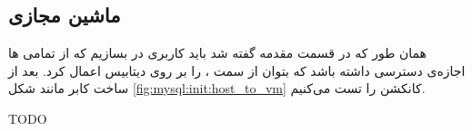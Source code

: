 \subsection{ماشین مجازی}
همان طور که در قسمت مقدمه گفته شد باید کاربری در
بسازیم که از تمامی
ها
اجازه‌ی دسترسی داشته باشد که بتوان از سمت
، 
را بر روی دیتابیس اعمال کرد. بعد از ساخت کابر مانند شکل
\ref{fig:mysql:init:host_to_vm}
کانکشن را تست می‌کنیم.

TODO